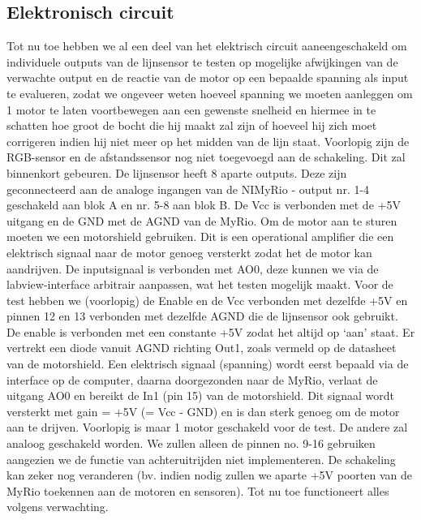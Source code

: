 \documentclass[kulak]{kulakarticle} %
\begin{document}
\subsection{Elektronisch circuit}
Tot nu toe hebben we al een deel van het elektrisch circuit aaneengeschakeld om individuele outputs van de lijnsensor te testen op mogelijke afwijkingen van de verwachte output en de reactie van de motor op een bepaalde spanning als input te evalueren, zodat we ongeveer weten hoeveel spanning we moeten aanleggen om 1 motor te laten voortbewegen aan een gewenste snelheid en hiermee in te schatten hoe groot de bocht die hij maakt zal zijn of hoeveel hij zich moet corrigeren indien hij niet meer op het midden van de lijn staat. 
Voorlopig zijn de RGB-sensor en de afstandssensor nog niet toegevoegd aan de schakeling. Dit zal binnenkort gebeuren.
De lijnsensor heeft 8 aparte outputs. Deze zijn geconnecteerd aan de analoge ingangen van de NIMyRio - output nr. 1-4 geschakeld aan blok A en nr. 5-8 aan blok B. De Vcc is verbonden met de +5V uitgang en de GND met de AGND van de MyRio.
Om de motor aan te sturen moeten we een motorshield gebruiken. Dit is een operational amplifier die een elektrisch signaal naar de motor genoeg versterkt zodat het de motor kan aandrijven. De inputsignaal is verbonden met AO0, deze kunnen we via de labview-interface arbitrair aanpassen, wat het testen mogelijk maakt. Voor de test hebben we (voorlopig) de Enable en de Vcc verbonden met dezelfde +5V en pinnen 12 en 13 verbonden met dezelfde AGND die de lijnsensor ook gebruikt. De enable is verbonden met een constante +5V zodat het altijd op ‘aan’ staat. Er vertrekt een diode vanuit AGND richting Out1, zoals vermeld op de datasheet van de motorshield. 
Een elektrisch signaal (spanning) wordt eerst bepaald via de interface op de computer, daarna doorgezonden naar de MyRio, verlaat de uitgang AO0 en bereikt de In1 (pin 15) van de motorshield. Dit signaal wordt versterkt met gain = +5V (= Vcc - GND) en is dan sterk genoeg om de motor aan te drijven.
Voorlopig is maar 1 motor geschakeld voor de test. De andere zal analoog geschakeld worden. We zullen alleen de pinnen no. 9-16 gebruiken aangezien we de functie van achteruitrijden niet implementeren.
De schakeling kan zeker nog veranderen (bv. indien nodig zullen we aparte +5V poorten van de MyRio toekennen aan de motoren en sensoren). Tot nu toe functioneert alles volgens verwachting.
\end{document}
